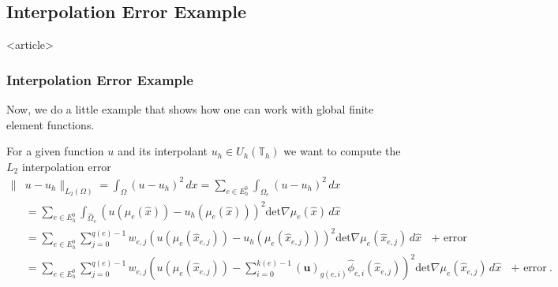 
\subsection{Interpolation Error Example}

\begin{frame}<article>
\frametitle{Interpolation Error Example}
Now, we do a little example that shows how one can work with global
finite element functions.

For a given function $u$ and its interpolant $u_h\in
U_h(\mathbb{T}_h)$ we want to compute the $L_2$ interpolation error 
\begin{equation*}
\begin{split}
\|&u-u_h\|_{L_2(\Omega)} = \int_\Omega (u-u_h)^2\, dx 
= \sum_{e\in E_h^0} \int_{\Omega_e} (u-u_h)^2\, dx \\
&= \sum_{e\in E_h^0} \int_{\hat{\Omega}_e} \left(u(\mu_e(\hat{x})) -
u_h(\mu_e(\hat{x})) \right)^2 \text{det} \nabla\mu_e(\hat{x}) \,
d\hat{x}\\
&= \sum_{e\in E_h^0} \sum_{j=0}^{q(e)-1} w_{e,j} \left( u(\mu_e(\hat{x}_{e,j})) -
u_h(\mu_e(\hat{x}_{e,j})) \right)^2 \text{det} \nabla\mu_e(\hat{x}_{e,j}) \,
d\hat{x} \text{ $+$ error}\\
&= \sum_{e\in E_h^0} \sum_{j=0}^{q(e)-1} w_{e,j} \left(u(\mu_e(\hat{x}_{e,j})) -
\sum_{i=0}^{k(e)-1}(\mathbf{u})_{g(e,i)} \hat\phi_{e,i}(\hat{x}_{e,j}) \right)^2  
\text{det} \nabla\mu_e(\hat{x}_{e,j}) \,  
d\hat{x} \text{ $+$ error} .
\end{split}
\end{equation*}
\end{frame}

